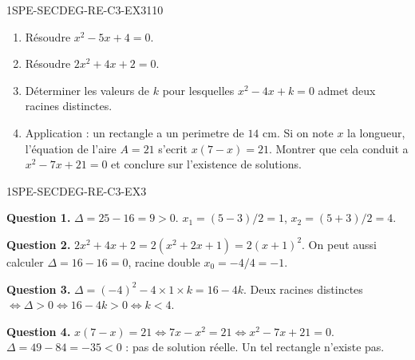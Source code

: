 
\begin{exercice}{1SPE-SECDEG-RE-C3-EX3}{1}{10}
\begin{enumerate}
  \item Résoudre $x^2 - 5x + 4 = 0$.
  \item Résoudre $2x^2 + 4x + 2 = 0$.
  \item Déterminer les valeurs de $k$ pour lesquelles $x^2 - 4x + k = 0$ admet deux racines distinctes.
  \item Application : un rectangle a un perimetre de $14$ cm. Si on note $x$ la longueur, l'équation de l'aire $A = 21$ s'ecrit $x(7-x) = 21$. Montrer que cela conduit a $x^2 - 7x + 21 = 0$ et conclure sur l'existence de solutions.
\end{enumerate}
\end{exercice}


\begin{corrige}{1SPE-SECDEG-RE-C3-EX3}

\textbf{Question 1.} $\Delta = 25 - 16 = 9 > 0$. $x_1 = (5-3)/2 = 1$, $x_2 = (5+3)/2 = 4$.

\textbf{Question 2.} $2x^2 + 4x + 2 = 2(x^2 + 2x + 1) = 2(x+1)^2$. On peut aussi calculer $\Delta = 16 - 16 = 0$, racine double $x_0 = -4/4 = -1$.

\textbf{Question 3.} $\Delta = (-4)^2 - 4 \times 1 \times k = 16 - 4k$. Deux racines distinctes $\Leftrightarrow \Delta > 0 \Leftrightarrow 16 - 4k > 0 \Leftrightarrow k < 4$.

\textbf{Question 4.} $x(7-x) = 21 \Leftrightarrow 7x - x^2 = 21 \Leftrightarrow x^2 - 7x + 21 = 0$.
$\Delta = 49 - 84 = -35 < 0$ : pas de solution réelle. Un tel rectangle n'existe pas.

\end{corrige}
